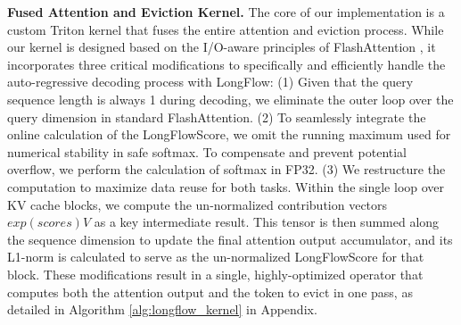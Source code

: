 \noindent\textbf{Fused Attention and Eviction Kernel.}
The core of our implementation is a custom Triton kernel that fuses the entire attention and eviction process. While our kernel is designed based on the I/O-aware principles of FlashAttention \citep{dao2022flashattention}, it incorporates three critical modifications to specifically and efficiently handle the auto-regressive decoding process with LongFlow:
(1) Given that the query sequence length is always 1 during decoding, we eliminate the outer loop over the query dimension in standard FlashAttention.
(2) To seamlessly integrate the online calculation of the LongFlowScore, we omit the running maximum used for numerical stability in safe softmax. To compensate and prevent potential overflow, we perform the calculation of softmax in FP32.
(3) We restructure the computation to maximize data reuse for both tasks. Within the single loop over KV cache blocks, we compute the un-normalized contribution vectors $exp(scores)V$ as a key intermediate result. This tensor is then summed along the sequence dimension to update the final attention output accumulator, and its L1-norm is calculated to serve as the un-normalized LongFlowScore for that block.
These modifications result in a single, highly-optimized operator that computes both the attention output and the token to evict in one pass, as detailed in Algorithm \ref{alg:longflow_kernel} in Appendix.